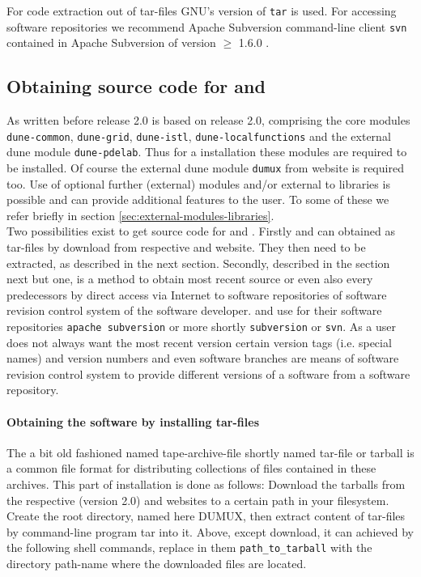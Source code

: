 For code extraction out of tar-files GNU's version of \texttt{tar} is used.
For accessing software repositories we recommend Apache Subversion command-line client \texttt{svn}
contained in Apache Subversion of version $\geqslant$ 1.6.0 \cite{APACHE-SUBVERSION-HP}. 

\subsection{Obtaining source code for \Dune and \Dumux}
As written before \Dumux release 2.0 is based on \Dune release 2.0, comprising the core modules 
\texttt{dune-common}, \texttt{dune-grid}, \texttt{dune-istl}, \texttt{dune-localfunctions} and the external dune
module \texttt{dune-pdelab}. Thus for a \Dumux installation these modules are required to be installed.
Of course the external dune module \texttt{dumux} from \Dumux website is required too.
Use of optional further (external) \Dune modules  and/or external to \Dune libraries is possible and can provide additional features to the user. To some of these we refer briefly in section \ref{sec:external-modules-libraries}.\\

Two possibilities exist to get source code for \Dune and \Dumux.
Firstly \Dune and \Dumux can obtained as tar-files by download from respective {\Dune} and {\Dumux} website. They then need to be extracted, as described in the next section.
Secondly, described in the section next but one, is a method to obtain most recent source or even also every predecessors by direct access via Internet to software repositories of software revision control system of the software developer. \Dune and \Dumux use for their software repositories \texttt{apache subversion} or more shortly \texttt{subversion} or \texttt{svn}.
As a user does not always want the most recent version
certain version tags (i.e. special names) and version numbers and even software branches are means of software revision control system to provide different versions of a software from a software repository.

\paragraph{Obtaining the software by installing tar-files}
The a bit old fashioned named tape-archive-file shortly named tar-file or tarball is a common file format for distributing collections of files contained in these archives.
This part of installation is done as follows: 
Download the tarballs from the respective \Dune (version 2.0) and \Dumux websites to a certain path in your filesystem.
Create the {\Dune} root directory, named here DUMUX, then extract content of tar-files by command-line program tar into it.
Above, except download, it can achieved by the following shell commands, replace in them \texttt{path\_to\_tarball} with the directory path-name where the downloaded files are located.

